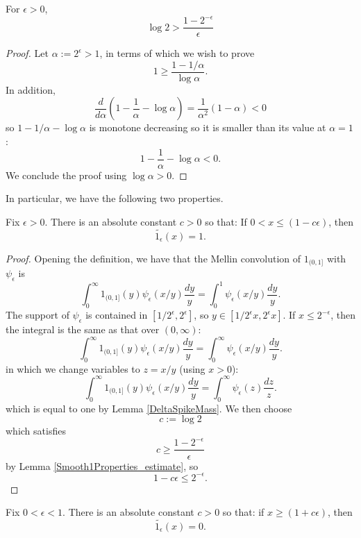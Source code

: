 \begin{lemma}\label{Smooth1Properties_estimate}
\leanok
For $\epsilon>0$,
$$
  \log2>\frac{1-2^{-\epsilon}}\epsilon
$$
\end{lemma}


\begin{proof}
Let $\alpha:=2^\epsilon>1$, in terms of which we wish to prove
$$
  1\geqslant\frac{1-1/\alpha}{\log \alpha}
  .
$$
In addition,
$$
  \frac d{d\alpha}\left(1-\frac1\alpha-\log \alpha\right)=\frac1{\alpha^2}(1-\alpha)<0
$$
so $1-1/\alpha-\log\alpha$ is monotone decreasing so it is smaller than its value at $\alpha=1$:
$$
  1-\frac1\alpha-\log\alpha<0
  .
$$
We conclude the proof using $\log\alpha>0$.
\end{proof}


In particular, we have the following two properties.
\begin{lemma}\label{Smooth1Properties_below}
\leanok
Fix $\epsilon>0$. There is an absolute constant $c>0$ so that:
If $0<x\leq (1-c\epsilon)$, then
$$\widetilde{1_{\epsilon}}(x) = 1.$$
\end{lemma}


\begin{proof}
Opening the definition, we have that the Mellin convolution of $1_{(0,1]}$ with $\psi_\epsilon$ is
$$
\int_0^\infty 1_{(0,1]}(y)\psi_\epsilon(x/y)\frac{dy}{y}
=
\int_0^1 \psi_\epsilon(x/y)\frac{dy}{y}.
$$
The support of $\psi_\epsilon$ is contained in $[1/2^\epsilon,2^\epsilon]$, so
$y \in [1/2^\epsilon x,2^\epsilon x]$. If $x \le 2^{-\epsilon}$, then the integral is the same as that over $(0,\infty)$:
$$
\int_0^\infty 1_{(0,1]}(y)\psi_\epsilon(x/y)\frac{dy}{y}
=
\int_0^\infty \psi_\epsilon(x/y)\frac{dy}{y}.
$$
in which we change variables to $z=x/y$ (using $x>0$):
$$
\int_0^\infty 1_{(0,1]}(y)\psi_\epsilon(x/y)\frac{dy}{y}
=
\int_0^\infty \psi_\epsilon(z)\frac{dz}{z}.
$$
which is equal to one by Lemma \ref{DeltaSpikeMass}.
We then choose
$$
  c:=\log 2
$$
which satisfies
$$
  c\geqslant\frac{1-2^{-\epsilon}}\epsilon
$$
by Lemma \ref{Smooth1Properties_estimate}, so
$$
  1-c\epsilon\leqslant 2^{-\epsilon}
  .
$$
\end{proof}


\begin{lemma}\label{Smooth1Properties_above}
\leanok
Fix $0<\epsilon<1$. There is an absolute constant $c>0$ so that:
if $x\geq (1+c\epsilon)$, then
$$\widetilde{1_{\epsilon}}(x) = 0.$$
\end{lemma}


